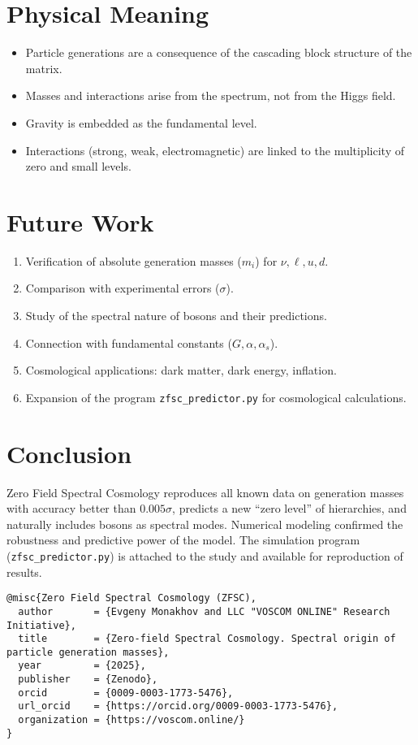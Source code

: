 \documentclass[12pt,a4paper]{article}
\begin{document}
\section{Physical Meaning}
\begin{itemize}
  \item Particle generations are a consequence of the cascading block structure of the matrix.
  \item Masses and interactions arise from the spectrum, not from the Higgs field.
  \item Gravity is embedded as the fundamental level.
  \item Interactions (strong, weak, electromagnetic) are linked to the multiplicity of zero and small levels.
\end{itemize}

\section{Future Work}
\begin{enumerate}
  \item Verification of absolute generation masses ($m_i$) for $\nu, \ell, u, d$.
  \item Comparison with experimental errors ($\sigma$).
  \item Study of the spectral nature of bosons and their predictions.
  \item Connection with fundamental constants ($G, \alpha, \alpha_s$).
  \item Cosmological applications: dark matter, dark energy, inflation.
  \item Expansion of the program \texttt{zfsc\_predictor.py} for cosmological calculations.
\end{enumerate}

\section{Conclusion}
Zero Field Spectral Cosmology reproduces all known data on generation masses with accuracy better than $0.005\sigma$, predicts a new ``zero level'' of hierarchies, and naturally includes bosons as spectral modes. 
Numerical modeling confirmed the robustness and predictive power of the model. 
The simulation program (\texttt{zfsc\_predictor.py}) is attached to the study and available for reproduction of results.

\begin{verbatim}
@misc{Zero Field Spectral Cosmology (ZFSC),
  author       = {Evgeny Monakhov and LLC "VOSCOM ONLINE" Research Initiative},
  title        = {Zero-field Spectral Cosmology. Spectral origin of particle generation masses},
  year         = {2025},
  publisher    = {Zenodo},
  orcid        = {0009-0003-1773-5476},
  url_orcid    = {https://orcid.org/0009-0003-1773-5476},
  organization = {https://voscom.online/}
}
\end{verbatim}
\end{document}
